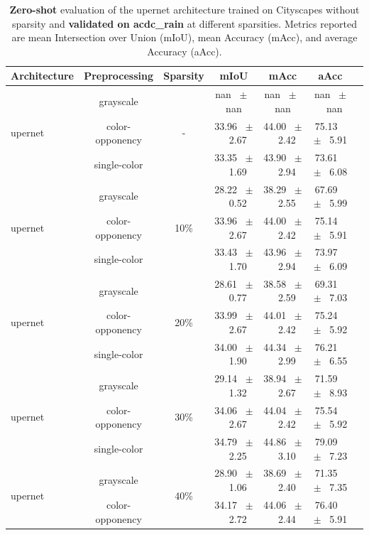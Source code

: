 \begin{table}[h]
  \centering
  \caption{\textbf{Zero-shot} evaluation of the upernet architecture trained on Cityscapes without sparsity and \textbf{validated on acdc_rain} at different sparsities. Metrics reported are mean Intersection over Union (mIoU), mean Accuracy (mAcc), and average Accuracy (aAcc).}
  \begin{tabular}{@{}lccc ccc@{}}
    \toprule
    Architecture & Preprocessing & Sparsity & mIoU & mAcc & aAcc \\
    \midrule
    \multirow{3}{*}{upernet} & grayscale & \multirow{3}{*}{-} & nan ~$\pm$~ nan & nan ~$\pm$~ nan & nan ~$\pm$~ nan \\
    & color-opponency &  & 33.96 ~$\pm$~ 2.67 & 44.00 ~$\pm$~ 2.42 & 75.13 ~$\pm$~ 5.91 \\
    & single-color &  & 33.35 ~$\pm$~ 1.69 & 43.90 ~$\pm$~ 2.94 & 73.61 ~$\pm$~ 6.08 \\
    \midrule
    \multirow{3}{*}{upernet} & grayscale & \multirow{3}{*}{10\%} & 28.22 ~$\pm$~ 0.52 & 38.29 ~$\pm$~ 2.55 & 67.69 ~$\pm$~ 5.99 \\
    & color-opponency &  & 33.96 ~$\pm$~ 2.67 & 44.00 ~$\pm$~ 2.42 & 75.14 ~$\pm$~ 5.91 \\
    & single-color &  & 33.43 ~$\pm$~ 1.70 & 43.96 ~$\pm$~ 2.94 & 73.97 ~$\pm$~ 6.09 \\
    \midrule
    \multirow{3}{*}{upernet} & grayscale & \multirow{3}{*}{20\%} & 28.61 ~$\pm$~ 0.77 & 38.58 ~$\pm$~ 2.59 & 69.31 ~$\pm$~ 7.03 \\
    & color-opponency &  & 33.99 ~$\pm$~ 2.67 & 44.01 ~$\pm$~ 2.42 & 75.24 ~$\pm$~ 5.92 \\
    & single-color &  & 34.00 ~$\pm$~ 1.90 & 44.34 ~$\pm$~ 2.99 & 76.21 ~$\pm$~ 6.55 \\
    \midrule
    \multirow{3}{*}{upernet} & grayscale & \multirow{3}{*}{30\%} & 29.14 ~$\pm$~ 1.32 & 38.94 ~$\pm$~ 2.67 & 71.59 ~$\pm$~ 8.93 \\
    & color-opponency &  & 34.06 ~$\pm$~ 2.67 & 44.04 ~$\pm$~ 2.42 & 75.54 ~$\pm$~ 5.92 \\
    & single-color &  & 34.79 ~$\pm$~ 2.25 & 44.86 ~$\pm$~ 3.10 & 79.09 ~$\pm$~ 7.23 \\
    \midrule
    \multirow{3}{*}{upernet} & grayscale & \multirow{3}{*}{40\%} & 28.90 ~$\pm$~ 1.06 & 38.69 ~$\pm$~ 2.40 & 71.35 ~$\pm$~ 7.35 \\
    & color-opponency &  & 34.17 ~$\pm$~ 2.72 & 44.06 ~$\pm$~ 2.44 & 76.40 ~$\pm$~ 5.91 \\

\end{tabular}
\end{table}
